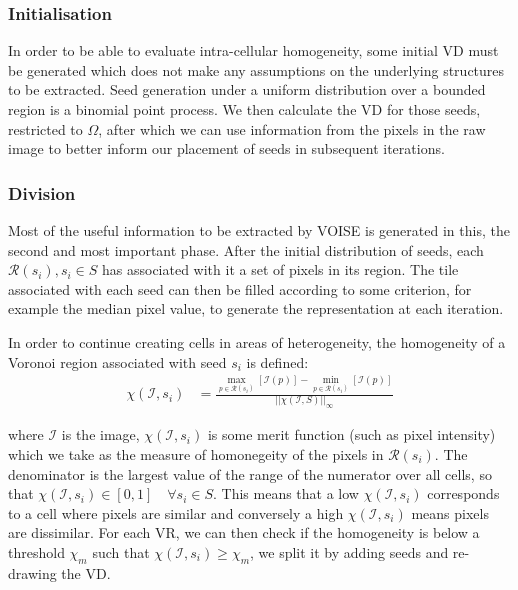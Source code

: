 \documentclass[12pt, report, a4paper, titlepage]{article}
\numberwithin{equation}{section}
\begin{document}
\subsubsection{Initialisation}

In order to be able to evaluate intra-cellular homogeneity, some initial VD must be generated which does not make any assumptions on the underlying structures to be extracted. Seed generation under a uniform distribution over a bounded region is a binomial point process. We then calculate the VD for those seeds, restricted to $\Omega$, after which we can use information from the pixels in the raw image to better inform our placement of seeds in subsequent iterations.

\subsubsection{Division}

Most of the useful information to be extracted by VOISE is generated in this, the second and most important phase. After the initial distribution of seeds, each $\mathcal{R}(s_i), s_i \in S$ has associated with it a set of pixels in its region. The tile associated with each seed can then be filled according to some criterion, for example the median pixel value, to generate the representation at each iteration.

In order to continue creating cells in areas of heterogeneity, the homogeneity of a Voronoi region associated with seed $s_i$ is defined:
\begin{align}
\label{homogeneity}
	\chi(\mathcal{I}, s_i) &= \frac{\max_{p \in \mathcal{R}(s_i)} [\mathcal{I}(p)] - \min_{p \in \mathcal{R}(s_i)} [\mathcal{I}(p)]}{\left|\left|\chi (\mathcal{I}, S) \right|\right|_\infty}
\end{align}

where $\mathcal{I}$ is the image, $\chi(\mathcal{I}, s_i)$ is some merit function (such as pixel intensity) which we take as the measure of homonegeity of the pixels in $\mathcal{R}(s_i)$. The denominator is the largest value of the range of the numerator over all cells, so that $\chi(\mathcal{I}, s_i) \in [0, 1] \quad \forall s_i \in S$. This means that a low $\chi(\mathcal{I}, s_i)$ corresponds to a cell where pixels are similar and conversely a high $\chi(\mathcal{I}, s_i)$ means pixels are dissimilar. For each VR, we can then check if the homogeneity is below a threshold $\chi_m$ such that $\chi(\mathcal{I}, s_i) \geq \chi_m$, we split it by adding seeds and re-drawing the VD.
\end{document}
